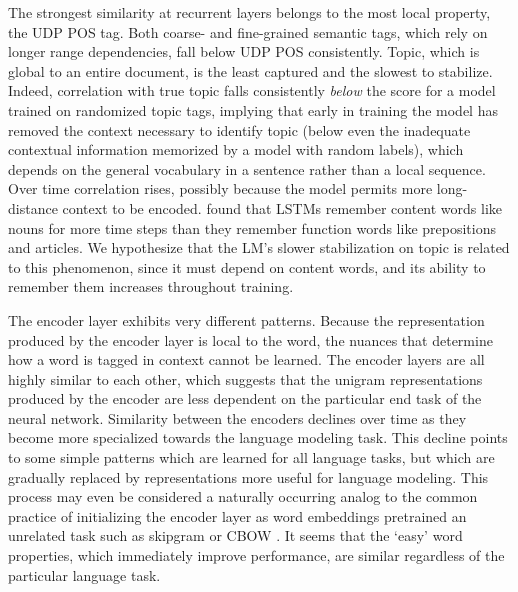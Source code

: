 The strongest similarity at recurrent layers belongs to the most local property, the UDP POS tag. Both coarse- and fine-grained semantic tags, which rely on longer range dependencies, fall below UDP POS consistently. Topic, which is global to an entire document, is the least captured and the slowest to stabilize. Indeed, correlation with true topic falls consistently \emph{below} the score for a model trained on randomized topic tags, implying that early in training the model has  removed the context necessary to identify topic (below even the inadequate contextual information memorized by a model with random labels), which depends on the general vocabulary in a sentence rather than a local sequence. Over time correlation rises, possibly because the model permits more long-distance context to be encoded. \citeauthor{khandelwal_sharp_2018} found that LSTMs remember content words like nouns for more time steps than they remember function words like prepositions and articles. We hypothesize that the LM's slower stabilization on topic is related to this phenomenon, since it must depend on content words, and its ability to remember them increases throughout training.

The encoder layer exhibits very different patterns. Because the representation produced by the encoder layer is local to the word, the nuances that determine how a word is tagged in context cannot be learned. The encoder layers are all highly similar to each other, which suggests that the unigram representations produced by the encoder are less dependent on the particular end task of the neural network. Similarity between the encoders declines over time as they become more specialized towards the language modeling task. This decline points to some simple patterns which are learned for all language tasks, but which are gradually replaced by representations more useful for language modeling. This process may even be considered a naturally occurring analog to the common practice of initializing the encoder layer as word embeddings pretrained an unrelated task  such as skipgram or CBOW \cite{mikolov_distributed_2013}. It seems that the `easy' word properties, which immediately improve performance, are similar regardless of the particular language task. 

